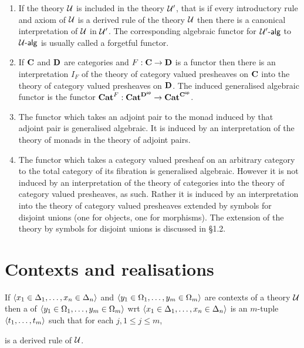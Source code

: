   \begin{examples}

    \begin{enumerate}
      \item If the theory $\mathcal{U}$ is included in the theory $\mathcal{U}'$, that is if every introductory rule and axiom of $\mathcal{U}$ is a derived rule of the theory $\mathcal{U}$ then there is a canonical interpretation of $\mathcal{U}$ in $\mathcal{U}'$.
        The corresponding algebraic functor for $\mathcal{U}'\text{-}\mathsf{alg}$ to $\mathcal{U}\text{-}\mathsf{alg}$ is usually called a forgetful functor.

      \item If $\mathbf{C}$ and $\mathbf{D}$ are categories and $F:\mathbf{C}\to\mathbf{D}$ is a functor then there is an interpretation $I_F$ of the theory of category valued presheaves on $\mathbf{C}$ into the theory of category valued presheaves on $\mathbf{D}$. The induced generalised algebraic functor is the functor $\mathbf{Cat}^F:\mathbf{Cat}^{\mathbf{D}^{\mathsf{op}}}\to\mathbf{Cat}^{\mathbf{C}^{\mathsf{op}}}$.

      \item The functor which takes an adjoint pair to the monad induced by that adjoint pair is generalised algebraic.
        It is induced by an interpretation of the theory of monads in the theory of adjoint pairs.

      \item The functor which takes a category valued presheaf on an arbitrary category to the total category of its fibration is generalised algebraic.
        However it is not induced by an interpretation of the theory of categories into the theory of category valued presheaves, as such.
        Rather it is induced by an interpretation into the theory of category valued presheaves extended by symbols for disjoint unions (one for objects, one for morphisms).
        The extension of the theory by symbols for disjoint unions is discussed in \S 1.2.
    \end{enumerate}
  \end{examples}

  \section{Contexts and realisations} \label{sec:source-1-12}

  \begin{definition}
    If $\langle x_1 \in \Delta_1, \dots, x_n \in \Delta_n \rangle$ and $\langle y_1 \in \Omega_1, \dots, y_m \in \Omega_m \rangle$ are contexts of a theory $\mathcal{U}$ then a  of $\langle y_1 \in \Omega_1, \dots, y_m \in \Omega_m \rangle$ wrt $\langle x_1 \in \Delta_1, \dots, x_n \in \Delta_n \rangle$ is an $m$-tuple $\langle t_1, \dots, t_m \rangle$ such that for each $j, 1 \le j \le m$,
    \begin{mathpar}
    \end{mathpar}
    is a derived rule of $\mathcal{U}$.
  \end{definition}


